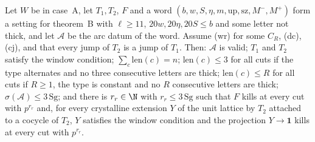 \begin{proposition}\label{pf:linkN-adm:arcsetup}
Let $W$ be in case~A, let $T_1,T_2$, $F$ and a word $(b,w,S,\eta,m,\mathrm{up},\mathrm{sz},M^-,M^+)$ form a setting for
theorem~B with $\ell\ge11$, $20w,20\eta,20S\le b$ and some letter not thick, and let $\mathcal A$ be the arc datum of the
word. Assume (wr) for some $C_R$, (dc), (cj), and that every jump of $T_2$ is a jump of $T_1$. Then: $\mathcal A$ is valid;
$T_1$ and $T_2$ satisfy the window condition; $\sum_c\mathrm{len}(c)=n$; $\mathrm{len}(c)\le3$ for all cuts if the type
alternates and no three consecutive letters are thick; $\mathrm{len}(c)\le R$ for all cuts if $R\ge1$, the type is
constant and no $R$ consecutive letters are thick; $\sigma(\mathcal A)\le3\,\mathrm{Sg}$; and there is $r_r\in\N$ with
$r_r\le3\,\mathrm{Sg}$ such that $F$ kills at every cut with $p^{r_r}$ and, for every crystalline extension $Y$ of the unit
lattice by $T_2$ attached to a cocycle of $T_2$, $Y$ satisfies the window condition and the projection $Y\to\mathbf 1$
kills at every cut with $p^{r_r}$.
\end{proposition}

